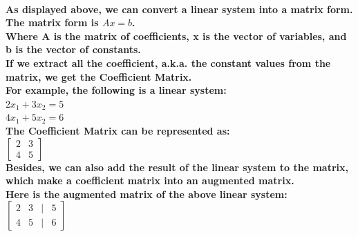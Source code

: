 \documentclass{article}
\begin{document}
\paragraph{As displayed above, we can convert a linear system into a matrix form.\\
The matrix form is $Ax = b$.\\
Where A is the matrix of coefficients, x is the vector of variables, and b is the vector of constants.\\
\hfill
If we extract all the coefficient, a.k.a. the constant values from the matrix, we get the Coefficient Matrix.\\
For example, the following is a linear system:\\
$2x_1 + 3x_2 = 5$\\
$4x_1 + 5x_2 = 6$\\
The Coefficient Matrix can be represented as:\\
$\begin{bmatrix} 2 & 3 \\ 4 & 5 \end{bmatrix}$\\
\hfill
Besides, we can also add the result of the linear system to the matrix, which make a coefficient matrix into an augmented matrix.\\
Here is the augmented matrix of the above linear system:\\
$\begin{bmatrix} 2 & 3 &|& 5 \\ 4 & 5 &|& 6 \end{bmatrix}$\\}
\end{document}

